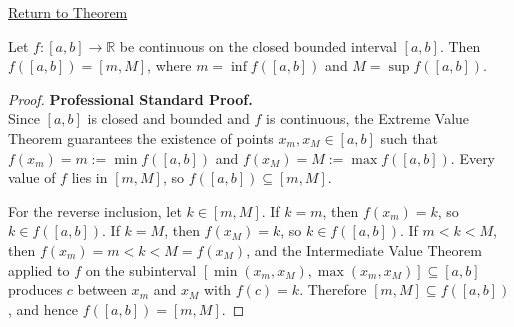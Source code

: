 \newpage
{}
\label{prf:image-of-closed-bounded-interval}

\begin{remark*}[Return]
\hyperref[thm:image-of-closed-bounded-interval]{Return to Theorem}
\end{remark*}

\begin{theorem*}
Let $f : [a,b] \to \mathbb{R}$ be continuous on the closed bounded interval $[a,b]$. Then $f([a,b]) = [m, M]$, where $m = \inf f([a,b])$ and $M = \sup f([a,b])$.
\end{theorem*}

\begin{proof}
\textbf{Professional Standard Proof.}~\\
Since $[a,b]$ is closed and bounded and $f$ is continuous, the Extreme Value Theorem guarantees the existence of points $x_m, x_M \in [a,b]$ such that $f(x_m) = m := \min f([a,b])$ and $f(x_M) = M := \max f([a,b])$. Every value of $f$ lies in $[m, M]$, so $f([a,b]) \subseteq [m, M]$.

For the reverse inclusion, let $k \in [m,M]$. If $k = m$, then $f(x_m) = k$, so $k \in f([a,b])$. If $k = M$, then $f(x_M) = k$, so $k \in f([a,b])$. If $m < k < M$, then $f(x_m) = m < k < M = f(x_M)$, and the Intermediate Value Theorem applied to $f$ on the subinterval $[\min(x_m, x_M), \max(x_m, x_M)] \subseteq [a,b]$ produces $c$ between $x_m$ and $x_M$ with $f(c) = k$. Therefore $[m,M] \subseteq f([a,b])$, and hence $f([a,b]) = [m, M]$.
\end{proof}

